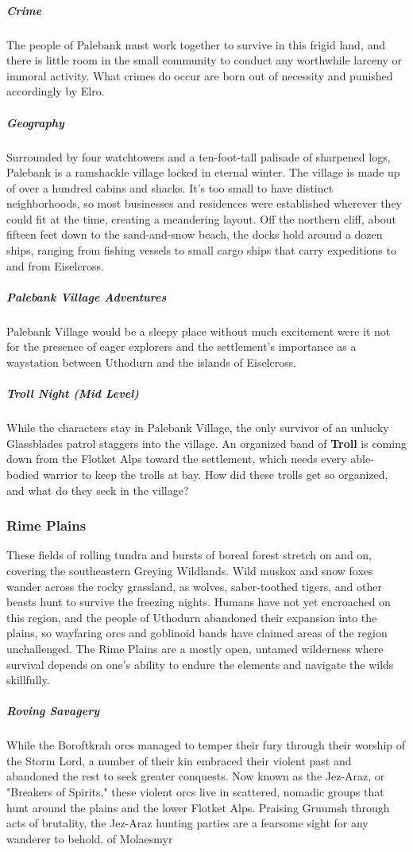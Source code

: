 \documentclass[10pt,a4paper,twoside,bg=print,twocolumn,openany,nodeprecatedcode]{dndbook}
\begin{document}
\subparagraph{Crime}
The people of Palebank must work together to survive in this frigid land, and there is little room in the small community to conduct any worthwhile larceny or immoral activity. What crimes do occur are born out of necessity and punished accordingly by Elro.

\subparagraph{Geography}
Surrounded by four watchtowers and a ten-foot-tall palisade of sharpened logs, Palebank is a ramshackle village locked in eternal winter. The village is made up of over a hundred cabins and shacks. It's too small to have distinct neighborhoods, so most businesses and residences were established wherever they could fit at the time, creating a meandering layout. Off the northern cliff, about fifteen feet down to the sand-and-snow beach, the docks hold around a dozen ships, ranging from fishing vessels to small cargo ships that carry expeditions to and from Eiselcross.

\subparagraph{Palebank Village Adventures}
Palebank Village would be a sleepy place without much excitement were it not for the presence of eager explorers and the settlement's importance as a waystation between Uthodurn and the islands of Eiselcross.

\subparagraph{Troll Night (Mid Level)}
While the characters stay in Palebank Village, the only survivor of an unlucky Glassblades patrol staggers into the village. An organized band of \textbf{Troll} is coming down from the Flotket Alps toward the settlement, which needs every able-bodied warrior to keep the trolls at bay. How did these trolls get so organized, and what do they seek in the village?

\subsubsection{Rime Plains}
These fields of rolling tundra and bursts of boreal forest stretch on and on, covering the southeastern Greying Wildlands. Wild muskox and snow foxes wander across the rocky grassland, as wolves, saber-toothed tigers, and other beasts hunt to survive the freezing nights. Humans have not yet encroached on this region, and the people of Uthodurn abandoned their expansion into the plains, so wayfaring orcs and goblinoid bands have claimed areas of the region unchallenged. The Rime Plains are a mostly open, untamed wilderness where survival depends on one's ability to endure the elements and navigate the wilds skillfully.

\subparagraph{Roving Savagery}
While the Boroftkrah orcs managed to temper their fury through their worship of the Storm Lord, a number of their kin embraced their violent past and abandoned the rest to seek greater conquests. Now known as the Jez-Araz, or "Breakers of Spirits," these violent orcs live in scattered, nomadic groups that hunt around the plains and the lower Flotket Alps. Praising Gruumsh through acts of brutality, the Jez-Araz hunting parties are a fearsome sight for any wanderer to behold. of Molaesmyr
\end{document}
